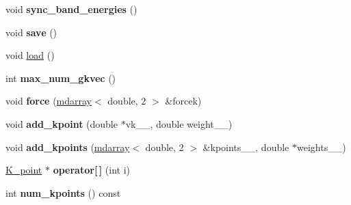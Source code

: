 \begin{DoxyCompactItemize}
\item 
\hypertarget{classsirius_1_1_k__point__set_a084765c90a079784b8ea292fbc694a1b}{}void {\bfseries sync\+\_\+band\+\_\+energies} ()\label{classsirius_1_1_k__point__set_a084765c90a079784b8ea292fbc694a1b}

\item 
\hypertarget{classsirius_1_1_k__point__set_aff0d069bd3cae9ed7ff759a73faba411}{}void {\bfseries save} ()\label{classsirius_1_1_k__point__set_aff0d069bd3cae9ed7ff759a73faba411}

\item 
void \hyperlink{classsirius_1_1_k__point__set_afcfce565bf318b680684ba144456a4a4}{load} ()
\item 
\hypertarget{classsirius_1_1_k__point__set_a633cdee2ff4f9f9d1fcb0ca42df627fe}{}int {\bfseries max\+\_\+num\+\_\+gkvec} ()\label{classsirius_1_1_k__point__set_a633cdee2ff4f9f9d1fcb0ca42df627fe}

\item 
\hypertarget{classsirius_1_1_k__point__set_a7935c90c81bca65ed02191c735008ef4}{}void {\bfseries force} (\hyperlink{classsddk_1_1mdarray}{mdarray}$<$ double, 2 $>$ \&forcek)\label{classsirius_1_1_k__point__set_a7935c90c81bca65ed02191c735008ef4}

\item 
\hypertarget{classsirius_1_1_k__point__set_a2e98e9e088d6f23efc874274d67ecc59}{}void {\bfseries add\+\_\+kpoint} (double $\ast$vk\+\_\+\+\_\+, double weight\+\_\+\+\_\+)\label{classsirius_1_1_k__point__set_a2e98e9e088d6f23efc874274d67ecc59}

\item 
\hypertarget{classsirius_1_1_k__point__set_a76a242f7ac9476b0f601bb7643501d99}{}void {\bfseries add\+\_\+kpoints} (\hyperlink{classsddk_1_1mdarray}{mdarray}$<$ double, 2 $>$ \&kpoints\+\_\+\+\_\+, double $\ast$weights\+\_\+\+\_\+)\label{classsirius_1_1_k__point__set_a76a242f7ac9476b0f601bb7643501d99}

\item 
\hypertarget{classsirius_1_1_k__point__set_ac5aa173ed5001c68ccf87d0938f82239}{}\hyperlink{classsirius_1_1_k__point}{K\+\_\+point} $\ast$ {\bfseries operator\mbox{[}$\,$\mbox{]}} (int i)\label{classsirius_1_1_k__point__set_ac5aa173ed5001c68ccf87d0938f82239}

\item 
\hypertarget{classsirius_1_1_k__point__set_a44d78218480e1078ed21131e831f3fcb}{}int {\bfseries num\+\_\+kpoints} () const \label{classsirius_1_1_k__point__set_a44d78218480e1078ed21131e831f3fcb}


\end{DoxyCompactItemize}
